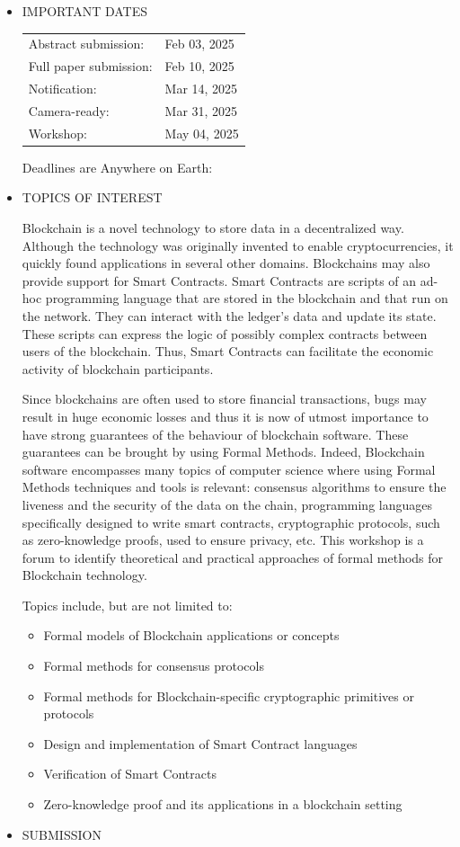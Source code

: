 \documentclass[prodmode,acmtecs]{acmsmall} %
\begin{document}
\begin{itemize}\item  IMPORTANT DATES 
 
\begin{tabulary}{\linewidth}{LL}Abstract submission:  & Feb 03, 2025 \\
Full paper submission:  & Feb 10, 2025 \\
Notification:  & Mar 14, 2025 \\
Camera-ready:  & Mar 31, 2025 \\
Workshop:  & May 04, 2025 \\
\end{tabulary}
 
  Deadlines are Anywhere on Earth: 
 
\item  TOPICS OF INTEREST 
 
  Blockchain is a novel technology to store data in a decentralized way. Although the technology was originally invented to enable cryptocurrencies, it quickly found applications in several other domains. Blockchains may also provide support for Smart Contracts. Smart Contracts are scripts of an ad-hoc programming language that are stored in the blockchain and that run on the network. They can interact with the ledger’s data and update its state. These scripts can express the logic of possibly complex contracts between users of the blockchain. Thus, Smart Contracts can facilitate the economic activity of blockchain participants. 
 
  Since blockchains are often used to store financial transactions, bugs may result in huge economic losses and thus it is now of utmost importance to have strong guarantees of the behaviour of blockchain software. These guarantees can be brought by using Formal Methods. Indeed, Blockchain software encompasses many topics of computer science where using Formal Methods techniques and tools is relevant: consensus algorithms to ensure the liveness and the security of the data on the chain, programming languages specifically designed to write smart contracts, cryptographic protocols, such as zero-knowledge proofs, used to ensure privacy, etc. This workshop is a forum to identify theoretical and practical approaches of formal methods for Blockchain technology. 
 
  Topics include, but are not limited to: 
 
\begin{itemize}\item  Formal models of Blockchain applications or concepts
\item  Formal methods for consensus protocols
\item  Formal methods for Blockchain-specific cryptographic primitives or protocols
\item  Design and implementation of Smart Contract languages
\item  Verification of Smart Contracts
\item  Zero-knowledge proof and its applications in a blockchain setting
\end{itemize} 
\item  SUBMISSION 
 

\end{itemize}
\end{document}
